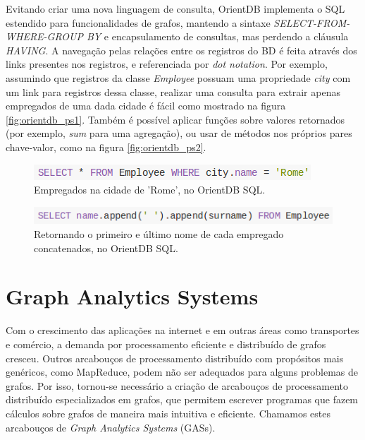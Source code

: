 \documentclass[conference]{IEEEtran}
\begin{document}
Evitando criar uma nova linguagem de consulta, OrientDB implementa o SQL estendido para funcionalidades de grafos, mantendo a sintaxe \emph{SELECT-FROM-WHERE-GROUP BY} e encapsulamento de consultas, mas perdendo a cláusula \emph{HAVING}. A navegação pelas relações entre os registros do BD é feita através dos links presentes nos registros, e referenciada por \emph{dot notation}. Por exemplo, assumindo que registros da classe \emph{Employee} possuam uma propriedade \emph{city} com um link para registros dessa classe, realizar uma consulta para extrair apenas empregados de uma dada cidade é fácil como mostrado na figura \ref{fig:orientdb_ps1}. Também é possível aplicar funções sobre valores retornados (por exemplo, \emph{sum} para uma agregação), ou usar de métodos nos próprios pares chave-valor, como na figura \ref{fig:orientdb_ps2}.

\begin{figure}[htbp]
\centerline{\includegraphics[width=0.9\linewidth]{orientdb_ps1.png}}
\caption{Empregados na cidade de 'Rome', no OrientDB SQL.}\label{fig:orientdb_ps1}
\label{fig}
\end{figure}

\begin{figure}[htbp]
\centerline{\includegraphics[width=0.9\linewidth]{orientdb_ps2.png}}
\caption{Retornando o primeiro e último nome de cada empregado concatenados, no OrientDB SQL.}\label{fig:orientdb_ps2}
\label{fig}
\end{figure}

\cite{nole-sartiani}
\cite{horton}
\cite{thingspan}

\section{Graph Analytics Systems}
Com o crescimento das aplicações na internet e em outras áreas como
transportes e comércio, a demanda por processamento eficiente e
distribuído de grafos cresceu. Outros arcabouços de processamento
distribuído com propósitos mais genéricos, como MapReduce, podem não ser
adequados para alguns problemas de grafos. Por isso, tornou-se
necessário a criação de arcabouços de processamento distribuído
especializados em grafos, que permitem escrever programas que fazem
cálculos sobre grafos de maneira mais intuitiva e eficiente. Chamamos
estes arcabouços de {\em Graph Analytics Systems} (GASs).
\end{document}
